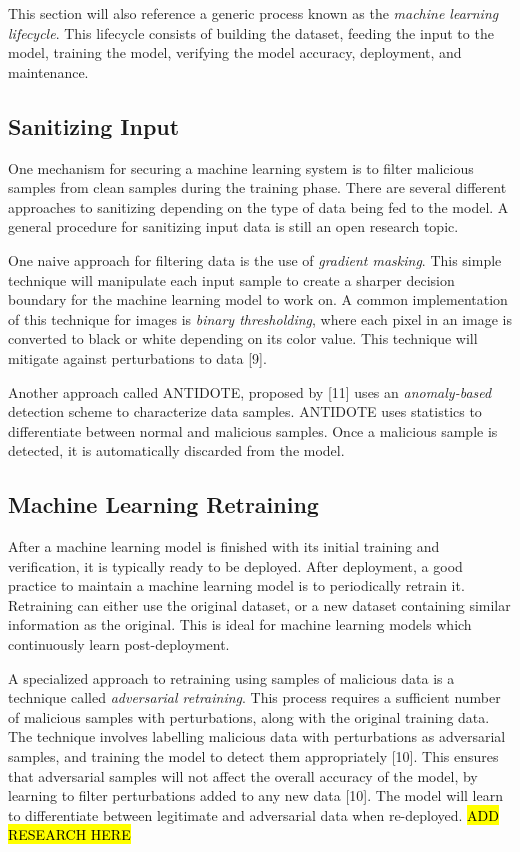 \documentclass[11pt,conference]{IEEEtran}
\begin{document}
This section will also reference a generic process known as the \emph{machine
learning lifecycle}. This lifecycle consists of building the dataset, feeding
the input to the model, training the model, verifying the model accuracy,
deployment, and maintenance.

\subsection{Sanitizing Input}
One mechanism for securing a machine learning system is to 
filter malicious samples from clean samples during the training phase. There
are several different approaches to sanitizing depending on the type of data
being fed to the model. A general procedure for sanitizing input data is still
an open research topic.

One naive approach for filtering data is the use of \emph{gradient masking}.
This simple technique will manipulate each input sample to create a sharper
decision boundary for the machine learning model to work on. A common
implementation of this technique for images is \emph{binary thresholding},
where each pixel in an image is converted to black or white depending on its
color value. This technique will mitigate against perturbations to data
[9].

Another approach called ANTIDOTE, proposed by [11] uses an \emph{anomaly-based}
detection scheme to characterize data samples. ANTIDOTE uses statistics to
differentiate between normal and malicious samples. Once a malicious sample is
detected, it is automatically discarded from the model.

\subsection{Machine Learning Retraining}
After a machine learning model is finished with its initial training and
verification, it is typically ready to be deployed. After deployment, a good
practice to maintain a machine learning model is to periodically retrain it.
Retraining can either use the original dataset, or a new dataset containing
similar information as the original. This is ideal for machine learning models
which continuously learn post-deployment.

A specialized approach to retraining using samples of malicious data is a technique called
\emph{adversarial retraining}. This process requires  
a sufficient number of malicious samples with perturbations, along with the
original training data. The technique
involves labelling malicious data with perturbations as adversarial samples, and training
the model to detect them appropriately [10]. This ensures that adversarial samples will not affect
the overall accuracy of the model, by learning to filter perturbations added to
any new data [10]. The model will learn to differentiate between legitimate and
adversarial data when re-deployed.
\hl{ADD RESEARCH HERE}
\end{document}
